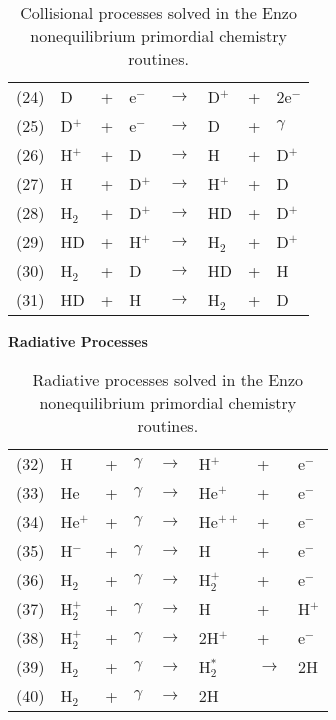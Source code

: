 \begin{table}
\begin{center}
\begin{tabular}{llllllll}
\hline
(24) & D & + & e$^-$ & $\rightarrow$ & D$^+$ &+& 2e$^-$ \\
(25) & D$^+$ &+ &e$^-$ & $\rightarrow$ & D &+ &$\gamma$ \\
(26) & H$^+$ &+ &D & $\rightarrow$ & H &+ &D$^+$ \\
(27) & H &+ &D$^+$ & $\rightarrow$ & H$^+$ &+ &D \\
(28) & H$_2$ &+ &D$^+$ & $\rightarrow$ & HD &+ &D$^+$ \\
(29) & HD &+ &H$^+$ & $\rightarrow$ & H$_2$ &+ &D$^+$ \\
(30) & H$_2$ &+ &D & $\rightarrow$ & HD &+ &H \\
(31) & HD &+ &H & $\rightarrow$ & H$_2$ &+ &D \\


\end{tabular}
\caption[]{Collisional processes solved in the Enzo nonequilibrium
primordial chemistry routines.}
\label{table.collisional}
\end{center}
\end{table}



\begin{table}
\begin{center}
{\bfseries Radiative Processes}\\[1ex]
\begin{tabular}{llllllll}
(32) & H & + & $\gamma$ & $\rightarrow$ & H$^+$ & + & e$^-$ \\
(33) & He & + & $\gamma$ & $\rightarrow$ & He$^+$ & + & e$^-$ \\
(34) & He$^+$ & + & $\gamma$ & $\rightarrow$ & He$^{++}$ & + & e$^-$ \\
(35) & H$^-$ & + & $\gamma$ & $\rightarrow$ & H & + & e$^-$ \\
(36) & H$_2$ & + & $\gamma$ & $\rightarrow$ & H$_2^+$ & + & e$^-$ \\
(37) & H$_2^+$ & + & $\gamma$ & $\rightarrow$ & H & + & H$^+$ \\
(38) & H$_2^+$ & + & $\gamma$ & $\rightarrow$ & 2H$^+$ & + & e$^-$ \\
(39) & H$_2$ & + & $\gamma$ & $\rightarrow$ & H$_2^*$ & $\rightarrow$ & 2H \\
(40) & H$_2$ & + & $\gamma$ & $\rightarrow$ & 2H &  & 
\end{tabular}
\caption[]{Radiative processes solved in the Enzo nonequilibrium
primordial chemistry routines. }
\label{table.radiative}
\end{center}
\end{table}

